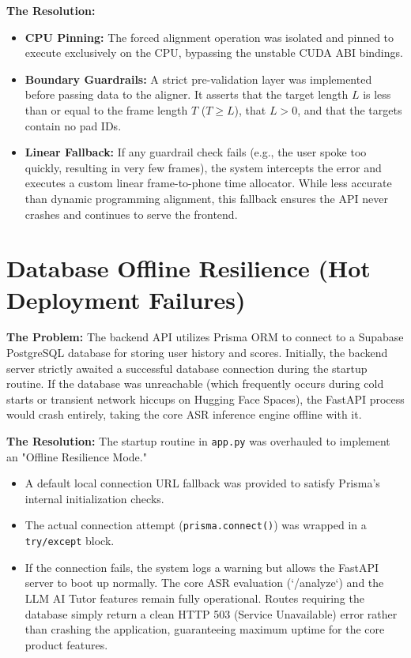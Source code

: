 \textbf{The Resolution:} 
\begin{itemize}
    \item \textbf{CPU Pinning:} The forced alignment operation was isolated and pinned to execute exclusively on the CPU, bypassing the unstable CUDA ABI bindings.
    \item \textbf{Boundary Guardrails:} A strict pre-validation layer was implemented before passing data to the aligner. It asserts that the target length $L$ is less than or equal to the frame length $T$ ($T \ge L$), that $L > 0$, and that the targets contain no pad IDs.
    \item \textbf{Linear Fallback:} If any guardrail check fails (e.g., the user spoke too quickly, resulting in very few frames), the system intercepts the error and executes a custom linear frame-to-phone time allocator. While less accurate than dynamic programming alignment, this fallback ensures the API never crashes and continues to serve the frontend.
\end{itemize}

\section{Database Offline Resilience (Hot Deployment Failures)}
\textbf{The Problem:} The backend API utilizes Prisma ORM to connect to a Supabase PostgreSQL database for storing user history and scores. Initially, the backend server strictly awaited a successful database connection during the startup routine. If the database was unreachable (which frequently occurs during cold starts or transient network hiccups on Hugging Face Spaces), the FastAPI process would crash entirely, taking the core ASR inference engine offline with it.

\textbf{The Resolution:}
The startup routine in \texttt{app.py} was overhauled to implement an "Offline Resilience Mode." 
\begin{itemize}
    \item A default local connection URL fallback was provided to satisfy Prisma's internal initialization checks.
    \item The actual connection attempt (\texttt{prisma.connect()}) was wrapped in a \texttt{try/except} block.
    \item If the connection fails, the system logs a warning but allows the FastAPI server to boot up normally. The core ASR evaluation (`/analyze`) and the LLM AI Tutor features remain fully operational. Routes requiring the database simply return a clean HTTP 503 (Service Unavailable) error rather than crashing the application, guaranteeing maximum uptime for the core product features.
\end{itemize}

